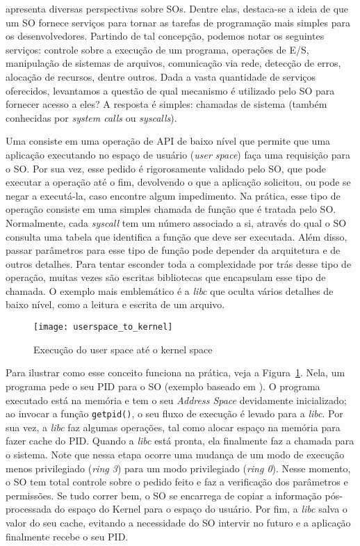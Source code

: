 \citet{silberschatz} apresenta diversas perspectivas sobre SOs. Dentre elas,
destaca-se a ideia de que um SO fornece serviços para tornar as tarefas de
programação mais simples para os desenvolvedores. Partindo de tal concepção,
podemos notar os seguintes serviços: controle sobre a execução de um programa,
operações de E/S, manipulação de sistemas de arquivos, comunicação via rede,
detecção de erros, alocação de recursos, dentre outros. Dada a vasta quantidade
de serviços oferecidos, levantamos a questão de qual mecanismo é utilizado pelo
SO para fornecer acesso a eles? A resposta é simples: chamadas de
sistema (também conhecidas por \emph{system calls} ou \emph{syscalls}).

Uma 
consiste em uma operação de API de baixo nível que permite que uma aplicação executando no
espaço de usuário (\emph{user space}) faça uma requisição para o SO. Por sua
vez, esse pedido é rigorosamente validado pelo SO, que pode executar a operação
até o fim, devolvendo o que a aplicação solicitou, ou pode se negar a
executá-la, caso encontre algum impedimento. Na prática, esse tipo de operação
consiste em uma simples chamada de função que é tratada pelo SO. Normalmente,
cada \emph{syscall} tem um número associado a si, através do qual o SO consulta
uma tabela que identifica a função que deve ser executada. Além disso, passar
parâmetros para esse tipo de função pode depender da arquitetura e de outros
detalhes. Para tentar esconder toda a complexidade por trás desse tipo de
operação, muitas vezes são escritas bibliotecas que encapsulam esse tipo de
chamada. O exemplo mais emblemático é a \emph{libc} que oculta vários detalhes
de baixo nível, como a leitura e escrita de um arquivo.

\begin{figure}[!h]
  \centering
  \texttt{[image: userspace\_to\_kernel]} 
  \caption{Execução do user space até o kernel space}
  \label{fig:userspace_kernelspace}
\end{figure}

Para ilustrar como esse conceito funciona na prática, veja a
Figura~\ref{fig:userspace_kernelspace}. Nela, um programa pede o
seu PID para o SO (exemplo baseado em \cite{syscallex}). O programa executado
está na memória e tem o seu \emph{Address Space} devidamente inicializado;
ao invocar a função \texttt{getpid()}, o seu fluxo de execução é levado para a
\emph{libc}. Por sua vez, a \emph{libc} faz algumas operações, tal como alocar
espaço na memória para fazer cache do PID. Quando a \emph{libc} está pronta,
ela finalmente faz a chamada para o sistema. Note que nessa etapa ocorre uma
mudança de um modo de execução menos privilegiado (\emph{ring 3}) para um modo
privilegiado (\emph{ring 0}). Nesse momento, o SO tem total controle sobre o
pedido feito e faz a verificação dos parâmetros e permissões. Se tudo correr
bem, o SO se encarrega de copiar a informação pós-processada do espaço do
Kernel para o espaço do usuário. Por fim, a \emph{libc} salva o valor do seu
cache, evitando a necessidade do SO intervir no futuro e a aplicação finalmente
recebe o seu PID.

